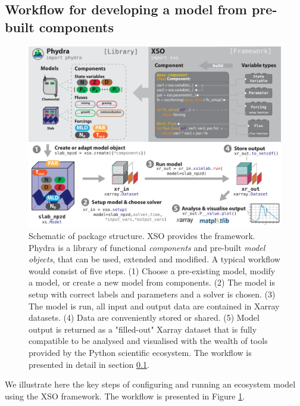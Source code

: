 \documentclass[journal abbreviation, manuscript]{copernicus}
\begin{document}
\subsection{Workflow for developing a model from pre-built components} \label{Section:ModelDevelopmentWorkflow}
%
\begin{figure}[t]
\includegraphics[width=12cm]{Figures/firstdraft_schematics/00_schematics_Package.pdf}
\caption{Schematic of package structure. XSO provides the framework. Phydra is a library of functional \textit{components} and pre-built \textit{model objects}, that can be used, extended and modified. A typical workflow would consist of five steps. (1) Choose a pre-existing model, modify a model, or create a new model from components. (2) The model is setup with correct labels and parameters and a solver is chosen. (3) The model is run, all input and output data are contained in Xarray datasets. (4) Data are conveniently stored or shared. (5) Model output is returned as a "filled-out" Xarray dataset that is fully compatible to be analysed and visualised with the wealth of tools provided by the Python scientific ecosystem. The workflow is presented in detail in section \ref{Section:ModelDevelopmentWorkflow}.}
\label{Figure:PhydraXSOPackageSchematics}
\end{figure}

We illustrate here the key steps of configuring and running an ecosystem model using the XSO framework. The workflow is presented in Figure \ref{Figure:PhydraXSOPackageSchematics}.
\end{document}
